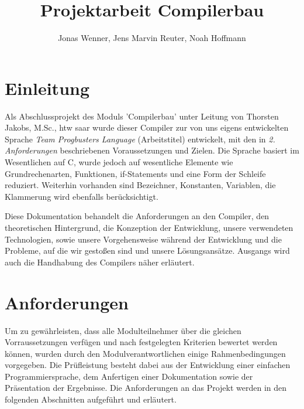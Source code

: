 \documentclass[12pt, a4paper, oneside, ngerman]{article}
\title{Projektarbeit Compilerbau}
\begin{document}
\author{Jonas Wenner, Jens Marvin Reuter, Noah Hoffmann}



\maketitle
%
%
\thispagestyle{empty}
\pagebreak

\tableofcontents
\newpage


\section{Einleitung}

Als Abschlussprojekt des Moduls 'Compilerbau' unter Leitung von Thorsten Jakobs, M.Sc., htw saar wurde dieser Compiler zur von uns eigens entwickelten Sprache \textit{Team Progbusters Language} (Arbeitstitel) entwickelt, mit den in \textit{2. Anforderungen} beschriebenen Voraussetzungen und Zielen. Die Sprache basiert im Wesentlichen auf C, wurde jedoch auf wesentliche Elemente wie Grundrechenarten, Funktionen, if-Statements und eine Form der Schleife reduziert. Weiterhin vorhanden sind Bezeichner, Konstanten, Variablen, die Klammerung wird ebenfalls ber\"ucksichtigt.


Diese Dokumentation behandelt die Anforderungen an den Compiler, den theoretischen Hintergrund, die Konzeption der Entwicklung, unsere verwendeten Technologien, sowie unsere Vorgehensweise während der Entwicklung und die Probleme, auf die wir gestoßen sind und unsere Lösungsansätze. Ausgangs wird auch die Handhabung des Compilers näher erläutert.

\newpage

\section{Anforderungen}

Um zu gewährleisten, dass alle Modulteilnehmer über die gleichen Vorraussetzungen verfügen und nach festgelegten Kriterien bewertet werden können, wurden durch den Modulverantwortlichen einige Rahmenbedingungen vorgegeben. Die Prüfleistung besteht dabei aus der Entwicklung einer einfachen Programmiersprache, dem Anfertigen einer Dokumentation sowie der Präsentation der Ergebnisse. Die Anforderungen an das Projekt werden in den folgenden Abschnitten aufgeführt und erläutert.
\end{document}
